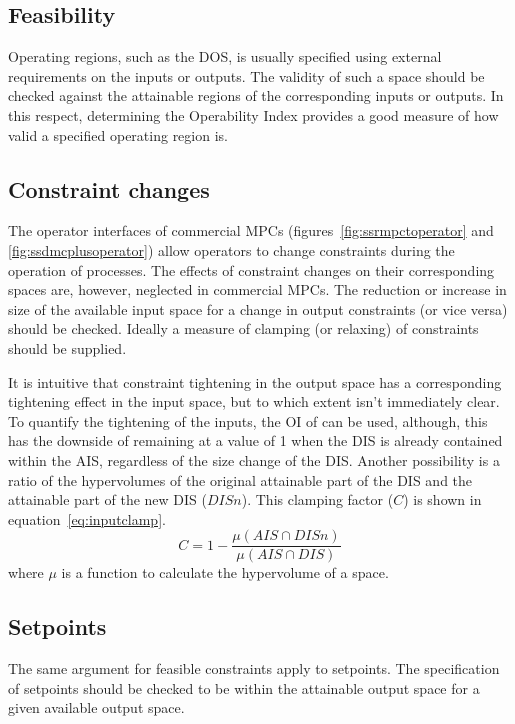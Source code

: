 \subsection{Feasibility}
Operating regions, such as the DOS, is usually specified using external requirements on the inputs or outputs.
The validity of such a space should be checked against the attainable regions of the corresponding inputs or outputs.
In this respect, determining the Operability Index provides a good measure of how valid a specified operating region is.

\subsection{Constraint changes}
The operator interfaces of commercial MPCs (figures~\ref{fig:ssrmpctoperator} and \ref{fig:ssdmcplusoperator}) allow operators to change constraints during the operation of processes.
The effects of constraint changes on their corresponding spaces are, however, neglected in commercial MPCs.
The reduction or increase in size of the available input space for a change in output constraints (or vice versa) should be checked.
Ideally a measure of clamping (or relaxing) of constraints should be supplied.

It is intuitive that constraint tightening in the output space has a corresponding tightening effect in the input space, but to which extent isn't immediately clear.
To quantify the tightening of the inputs, the OI of \citet{vinsonphd} can be used, although, this has the downside of remaining at a value of 1 when the DIS is already contained within the AIS, regardless of the size change of the DIS.
Another possibility is a ratio of the hypervolumes of the original attainable part of the DIS and the attainable part of the new DIS ($DISn$).
This clamping factor ($C$) is shown in equation~\ref{eq:inputclamp}.
\begin{equation}
  \label{eq:inputclamp}
  C = 1-\frac{\mu(AIS \cap DISn)}{\mu(AIS \cap DIS)}
\end{equation}
where $\mu$ is a function to calculate the hypervolume of a space.

\subsection{Setpoints}
The same argument for feasible constraints apply to setpoints.
The specification of setpoints should be checked to be within the attainable output space for a given available output space.

